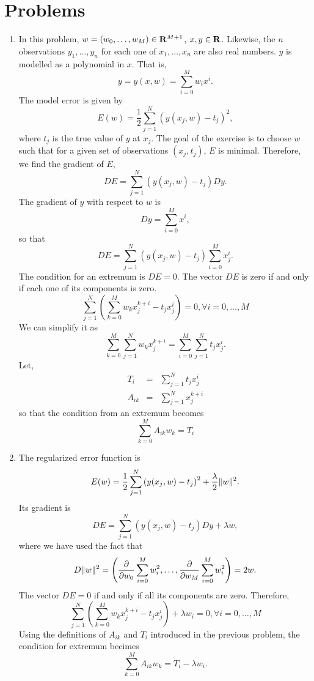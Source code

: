 \section{Problems}
\begin{enumerate}
\item In this problem, $w = (w_0, \ldots, w_M) \in \mathbf{R}^{M+1}$, $x, y \in \mathbf{R}$. Likewise, the $n$
observations $y_1, \ldots, y_n$ for each one of $x_1, \ldots, x_n$ are also real numbers. $y$
is modelled as a polynomial in $x$. That is,
\begin{equation}\label{c1pe1}
y = y(x, w) = \sum_{i=0}^Mw_ix^i.
\end{equation}
The model error is given by
\begin{equation}\label{c1pe2}
E(w) = \frac{1}{2}\sum_{j=1}^N \left(y(x_j, w) - t_j\right)^2,
\end{equation}
where $t_j$ is the true value of $y$ at $x_j$. The goal of the exercise is to choose $w$ such 
that for a given set of observations $(x_j, t_j)$, $E$ is minimal. Therefore, we find the
gradient of $E$,
\[
DE = \sum_{j=1}^N\left(y(x_j, w) - t_j\right)Dy.
\]
The gradient of $y$ with respect to $w$ is
\[
Dy = \sum_{i=0}^M x^i,
\]
so that
\[
DE = \sum_{j=1}^N\left(y(x_j, w) - t_j\right)\sum_{i=0}^M x_j^i.
\]
The condition for an extremum is $DE = 0$. The vector $DE$ is zero if and only if each one
of its components is zero.
\[
\sum_{j=1}^N\left(\sum_{k=0}^M w_k x_j^{k+i} - t_jx_j^i\right) = 0, \forall i = 0, \ldots, M
\]
We can simplify it as
\[
\sum_{k=0}^M \sum_{j=1}^N w_k x_j^{k+i} = \sum_{i=0}^M\sum_{j=1}^N t_jx_j^i.
\]
Let,
\begin{eqnarray*}
T_i &=& \sum_{j=1}^N t_jx_j^i \\
A_{ik} &=& \sum_{j=1}^N x_j^{k+i}
\end{eqnarray*}
so that the condition from an extremum becomes
\[
\sum_{k=0}^M A_{ik}w_k = T_i
\]

\item The regularized error function is
\begin{equation}\label{c1pe3}
E(w) = \frac{1}{2}\sum_{j=1}^N \left(y(x_j, w) - t_j\right)^2 + \frac{\lambda}{2}\lVert w\rVert^2.
\end{equation}
Its gradient is
\[
DE = \sum_{j=1}^N\left(y(x_j, w) - t_j\right)Dy + \lambda w,
\]
where we have used the fact that 
\[
D\lVert w\rVert^2 = \left(\frac{\partial}{\partial w_0}\sum_{i=0}^M w_i^2, \ldots, \frac{\partial}{\partial w_M}\sum_{i=0}^M w_i^2\right) = 2w.
\]
The vector $DE = 0$ if and only if all its components are zero. Therefore,
\[
\sum_{j=1}^N\left(\sum_{k=0}^M w_k x_j^{k+i} - t_jx_j^i\right) + \lambda w_i = 0, \forall i = 0, \ldots, M
\]
Using the definitions of $A_{ik}$ and $T_i$ introduced in the previous problem, the condition
for extremum becimes
\[
\sum_{k=0}^M A_{ik}w_k = T_i - \lambda w_i.
\]


\end{enumerate}
